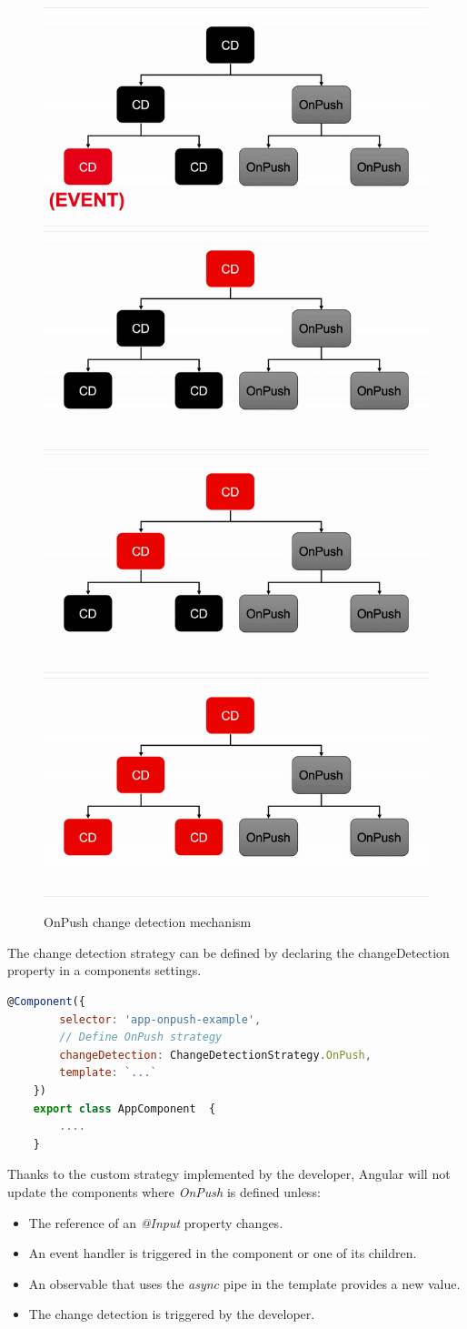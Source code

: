 \begin{figure}[h!]
    \caption{OnPush change detection mechanism}
    \centering
    \includegraphics[width=.49\textwidth]{img/onpush-cycle1.png} 
    \includegraphics[width=.49\textwidth]{img/onpush-cycle2.png} 
    \includegraphics[width=.49\textwidth]{img/onpush-cycle3.png} 
    \includegraphics[width=.49\textwidth]{img/onpush-cycle4.png} 
\end{figure}

The change detection strategy can be defined by declaring the changeDetection property in a components settings.
\begin{lstlisting}[language=JavaScript]
    @Component({
        selector: 'app-onpush-example',
        // Define OnPush strategy
        changeDetection: ChangeDetectionStrategy.OnPush,
        template: `...`
    })
    export class AppComponent  {
        ....      
    }
\end{lstlisting}

Thanks to the custom strategy implemented by the developer, Angular will not update the components where \emph{OnPush} is defined unless:
\begin{itemize}
    \item The reference of an \emph{@Input} property changes.
    \item An event handler is triggered in the component or one of its children.
    \item An observable that uses the \emph{async} pipe in the template provides a new value.
    \item The change detection is triggered by the developer.
\end{itemize}


